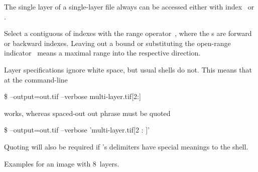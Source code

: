
The single layer of a single-layer file always can be accessed either with index~ or
.

Select a contiguous  of indexes with the range
operator~, where the \/s are
forward or backward indexes.  Leaving out a bound or substituting the open-range
indicator~ means a maximal range into the
respective direction.

Layer specifications ignore white space, but usual shells do not.  This means that at the
command-line

\begin{terminal}
  \$ \app{} --output=out.tif --verbose multi-layer.tif[2:]
\end{terminal}

\noindent works, whereas spaced-out out phrase  must be quoted

\begin{terminal}
  \$ \app{} --output=out.tif --verbose 'multi-layer.tif[2 : ]'
\end{terminal}

Quoting will also be required if \App's delimiters have special meanings to the shell.

\smallskip

Examples for an image with 8~layers.

